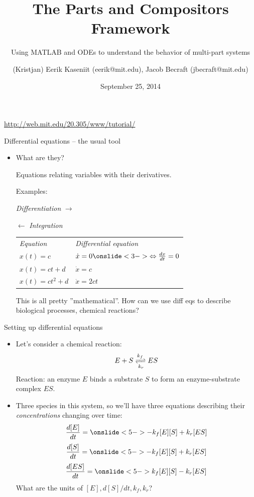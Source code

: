 \documentclass[handout]{beamer} %
\title{The Parts and Compositors Framework}
\subtitle{Using MATLAB and ODEs to understand the behavior of multi-part systems}
\author[kristjan@mit.edu]{(Kristjan) Eerik Kaseniit (eerik@mit.edu),
Jacob Becraft (jbecraft@mit.edu)}
\institute[MIT]{
	Massachusetts Institute of Technology \\
	20.305 Principles of Synthetic Biology
}
\date{September 25, 2014}
\begin{document}
\begin{frame}[plain]
  \titlepage
  
  \begin{center}\href{http://web.mit.edu/20.305/www/tutorial/}{http://web.mit.edu/20.305/www/tutorial/}\end{center}
\end{frame}

\begin{frame}{Differential equations -- the usual tool}

\begin{itemize}
\item What are they?

Equations relating variables with their derivatives.

\pause

Examples:

\hspace{23 mm}\emph{Differentiation} $\rightarrow$

\hspace{23 mm}$\leftarrow$ \emph{Integration}

\renewcommand{\arraystretch}{1.5}
\begin{tabular}{m{}m{}}
	\emph{Equation} & \emph{Differential equation} \\
	$ x(t) = c $ & $ \dot x = 0 \onslide<3->{\Leftrightarrow \frac{dx}{dt} = 0} $ \\
	\pause
	\pause
	$ x(t) = ct + d $ & $ \dot x = c $ \\
	\pause
	$ x(t) = ct^2 + d $ & $ \dot x = 2ct $ \\
\end{tabular}

\pause

\vspace{7 mm}

This is all pretty ''mathematical''. How can we use diff eqs to describe biological processes, chemical reactions?

\end{itemize}

\end{frame}


\begin{frame}{Setting up differential equations}

\begin{itemize}

\item Let's consider a chemical reaction:
\pause
$$ E + S \xrightleftharpoons[k_r]{k_f} ES $$
\pause
Reaction: an enzyme $E$ binds a substrate $S$ to form an enzyme-substrate complex $ES$.
\pause
\item Three species in this system, so we'll have three equations describing their \emph{concentrations} changing over time:
$$ \frac{d[E]}{dt} = \onslide<5->{-k_f [E][S] + k_r[ES]} $$
$$ \frac{d[S]}{dt} = \onslide<5->{-k_f [E][S] + k_r[ES]} $$
$$ \frac{d[ES]}{dt} = \onslide<5->{k_f [E][S] - k_r[ES]} $$
\pause
\pause
What are the units of $[E], d[S]/dt, k_f, k_r$?
\end{itemize}

\end{frame}
\end{document}
